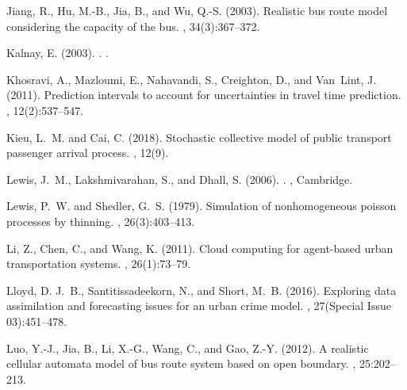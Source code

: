 \documentclass[11pt]{article}
\begin{document}
\begin{thebibliography}{}
Jiang, R., Hu, M.-B., Jia, B., and Wu, Q.-S. (2003).
\newblock Realistic bus route model considering the capacity of the bus.
, 34(3):367--372.

Kalnay, E. (2003).
.
.

Khosravi, A., Mazloumi, E., Nahavandi, S., Creighton, D., and Van~Lint, J.
  (2011).
\newblock Prediction intervals to account for uncertainties in travel time
  prediction.
,
  12(2):537--547.

Kieu, L.~M. and Cai, C. (2018).
\newblock Stochastic collective model of public transport passenger arrival
  process.
, 12(9).

Lewis, J.~M., Lakshmivarahan, S., and Dhall, S. (2006).
.
, Cambridge.

Lewis, P.~W. and Shedler, G.~S. (1979).
\newblock Simulation of nonhomogeneous poisson processes by thinning.
, 26(3):403--413.

Li, Z., Chen, C., and Wang, K. (2011).
\newblock Cloud computing for agent-based urban transportation systems.
, 26(1):73--79.

Lloyd, D. J.~B., Santitissadeekorn, N., and Short, M.~B. (2016).
\newblock Exploring data assimilation and forecasting issues for an urban crime
  model.
, 27(Special Issue
  03):451--478.

Luo, Y.-J., Jia, B., Li, X.-G., Wang, C., and Gao, Z.-Y. (2012).
\newblock A realistic cellular automata model of bus route system based on open
  boundary.
,
  25:202--213.


\end{thebibliography}
\end{document}
